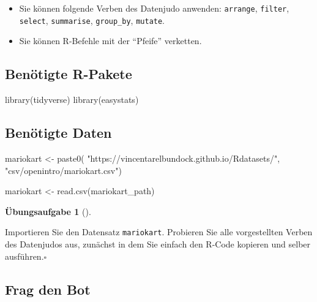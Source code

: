 \documentclass[
  letterpaper,
]{scrbook}
\newenvironment{Shaded}{\begin{snugshade}}{\end{snugshade}}
\newcommand{\FunctionTok}[1]{\textcolor[rgb]{0.28,0.35,0.67}{#1}}
\newcommand{\NormalTok}[1]{\textcolor[rgb]{0.00,0.23,0.31}{#1}}
\newcommand{\OtherTok}[1]{\textcolor[rgb]{0.00,0.23,0.31}{#1}}
\newcommand{\StringTok}[1]{\textcolor[rgb]{0.13,0.47,0.30}{#1}}
\providecommand{\tightlist}{%
  \setlength{\itemsep}{0pt}\setlength{\parskip}{0pt}}\usepackage{longtable,booktabs,array}
\theoremstyle{definition}
\theoremstyle{definition}
\theoremstyle{definition}
\newtheorem{exercise}{Übungsaufgabe}[chapter]
\theoremstyle{remark}
\begin{document}
\begin{itemize}
\tightlist
\item
  Sie können folgende Verben des Datenjudo anwenden: \texttt{arrange},
  \texttt{filter}, \texttt{select}, \texttt{summarise},
  \texttt{group\_by}, \texttt{mutate}.
\item
  Sie können R-Befehle mit der ``Pfeife'' verketten.
\end{itemize}

\subsection{Benötigte R-Pakete}\label{benuxf6tigte-r-pakete}

\begin{Shaded}
\begin{Highlighting}[]
\FunctionTok{library}\NormalTok{(tidyverse)}
\FunctionTok{library}\NormalTok{(easystats)}
\end{Highlighting}
\end{Shaded}

\subsection{Benötigte Daten}\label{benuxf6tigte-daten-1}

\begin{Shaded}
\begin{Highlighting}[]
\NormalTok{mariokart }\OtherTok{\textless{}{-}} \FunctionTok{paste0}\NormalTok{(}
  \StringTok{"https://vincentarelbundock.github.io/Rdatasets/"}\NormalTok{,}
  \StringTok{"csv/openintro/mariokart.csv"}\NormalTok{)}

\NormalTok{mariokart }\OtherTok{\textless{}{-}} \FunctionTok{read.csv}\NormalTok{(mariokart\_path)}
\end{Highlighting}
\end{Shaded}

\begin{exercise}[]\protect\hypertarget{exr-los}{}\label{exr-los}

Importieren Sie den Datensatz \texttt{mariokart}. Probieren Sie alle
vorgestellten Verben des Datenjudos aus, zunächst in dem Sie einfach den
R-Code kopieren und selber ausführen.\(\square\)

\end{exercise}

\subsection{Frag den Bot}\label{frag-den-bot}
\end{document}
